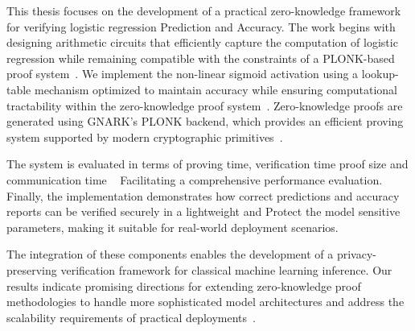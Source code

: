 This thesis focuses on the development of a practical zero-knowledge framework for verifying logistic regression Prediction and Accuracy. The work begins with designing arithmetic circuits that efficiently capture the computation of logistic regression while remaining compatible with the constraints of a PLONK-based proof system~\cite{gennaro2013quadratic}. We implement the non-linear sigmoid activation using a lookup-table mechanism optimized to maintain accuracy while ensuring computational tractability within the zero-knowledge proof system~\cite{cryptoeprint:2025/507}. Zero-knowledge proofs are generated using GNARK’s PLONK backend, which provides an efficient proving system supported by modern cryptographic primitives~\cite{gnark-v0.14.0}.  

The system is evaluated in terms of proving time, verification time proof size and communication time ~\cite{info15080463} Facilitating a comprehensive performance evaluation. Finally, the implementation demonstrates how correct predictions and accuracy reports can be verified securely in a lightweight and Protect the model sensitive parameters, making it suitable for real-world deployment scenarios.

The integration of these components enables the development of a privacy-preserving verification framework for classical machine learning inference. Our results indicate promising directions for extending zero-knowledge proof methodologies to handle more sophisticated model architectures and address the scalability requirements of practical deployments~\cite{cryptoeprint:2023/1174}.

\clearpage
